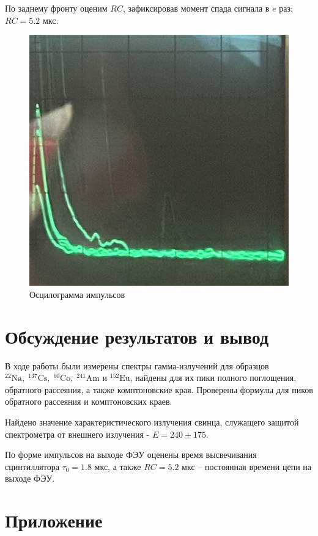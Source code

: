 \documentclass{article}
\begin{document}
    По заднему фронту оценим $RC$, зафиксировав момент спада сигнала в $e$ раз: $RC = 5.2$ мкс.

\begin{figure}[h!]
        \centering
        \includegraphics[width = 10 cm]{occct.jpg}
        \caption{Осцилограмма импульсов}
        \label{ooocccttt}
    \end{figure}










\section{Обсуждение результатов и вывод}

    В ходе работы были измерены спектры гамма-излучений для образцов $\mathrm{^{22}Na, \; ^{137}Cs, \; ^{60}Co, \; ^{241}Am}$ и $\mathrm{^{152}Eu}$, найдены для их пики полного поглощения, обратного рассеяния, а также комптоновские края. Проверены формулы для пиков обратного рассеяния и комптоновских краев.

    Найдено значение характеристического излучения свинца, служащего защитой спектрометра от внешнего излучения - $E = 240 \pm 175$.

    По форме импульсов на выходе ФЭУ оценены время высвечивания сцинтиллятора $\tau_0 = 1.8$ мкс, а также $RC = 5.2$ мкс -- постоянная времени цепи на выходе ФЭУ.


\newpage
\section*{Приложение} \label{prilosh}
\end{document}
